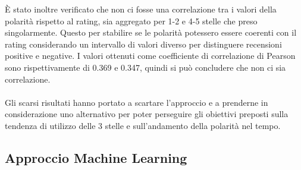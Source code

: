 È stato inoltre verificato che non ci fosse una correlazione tra i valori della polarità rispetto al rating, sia aggregato per 1-2 e 4-5 stelle che preso singolarmente. Questo per stabilire se le polarità potessero essere coerenti con il rating considerando un intervallo di valori diverso per distinguere recensioni positive e negative. I valori ottenuti come coefficiente di correlazione di Pearson sono rispettivamente di 0.369 e 0.347, quindi si può concludere che non ci sia correlazione.
\\\\
Gli scarsi risultati hanno portato a scartare l'approccio e a prenderne in considerazione uno alternativo per poter perseguire gli obiettivi preposti sulla tendenza di utilizzo delle 3 stelle e sull'andamento della polarità nel tempo.

\subsection{Approccio Machine Learning}\label{ApproccioMachineLearning}


